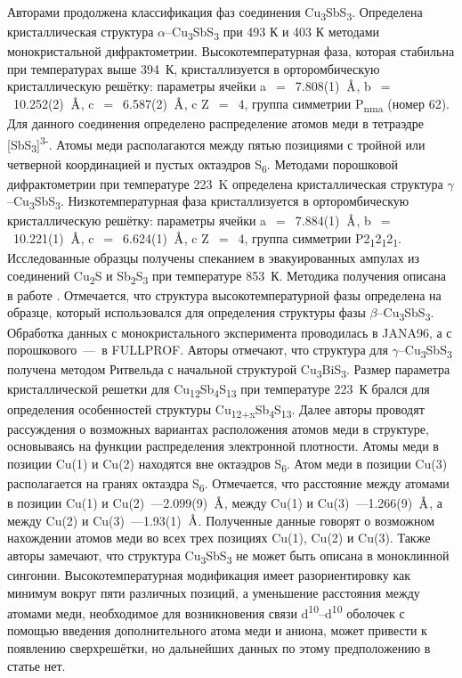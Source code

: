 Авторами \cite{Pfitzner1998a} продолжена классификация фаз соединения Cu\textsubscript{3}SbS\textsubscript{3}. Определена кристаллическая структура $\alpha$--Cu\textsubscript{3}SbS\textsubscript{3} при 493 К и 403 К методами монокристальной дифрактометрии. Высокотемпературная фаза, которая стабильна при температурах выше 394~К, кристаллизуется в орторомбическую кристаллическую решётку: параметры ячейки a~$=$~7.808(1)~$\mbox{\normalfont\AA}$, b~$=$~10.252(2)~$\mbox{\normalfont\AA}$, c~$=$~6.587(2)~$\mbox{\normalfont\AA}$,  c Z~$=$~4, группа симметрии P\textsubscript{nma} (номер 62). Для данного соединения определено распределение атомов меди в тетраэдре [SbS\textsubscript{3}]\textsuperscript{3-}.  Атомы меди располагаются между пятью позициями с тройной или четверной координацией и пустых октаэдров S\textsubscript{6}.  Методами порошковой дифрактометрии при температуре 223~K определена кристаллическая структура $\gamma$--Cu\textsubscript{3}SbS\textsubscript{3}. Низкотемпературная фаза кристаллизуется в орторомбическую кристаллическую решётку: параметры ячейки a~$=$~7.884(1)~$\mbox{\normalfont\AA}$, b~$=$~10.221(1)~$\mbox{\normalfont\AA}$, c~$=$~6.624(1)~$\mbox{\normalfont\AA}$,  c Z~$=$~4, группа симметрии P2\textsubscript{1}2\textsubscript{1}2\textsubscript{1}. Исследованные образцы получены спеканием в эвакуированных ампулах из соединений Cu\textsubscript{2}S и Sb\textsubscript{2}S\textsubscript{3} при температуре 853~К. Методика получения описана в работе \cite{Pfitzner_1994}. Отмечается, что структура высокотемпературной фазы определена на образце,  который использовался для определения структуры фазы $\beta$--Cu\textsubscript{3}SbS\textsubscript{3}. Обработка данных с монокристального эксперимента проводилась в JANA96, а с порошкового~---~в FULLPROF. Авторы отмечают, что структура для $\gamma$--Cu\textsubscript{3}SbS\textsubscript{3} получена методом Ритвельда с начальной структурой Cu\textsubscript{3}BiS\textsubscript{3}. Размер параметра кристаллической решетки для Cu\textsubscript{12}Sb\textsubscript{4}S\textsubscript{13} при температуре 223~К брался для определения особенностей структуры Cu\textsubscript{12+x}Sb\textsubscript{4}S\textsubscript{13}. Далее авторы проводят рассуждения о возможных вариантах расположения атомов меди в структуре, основываясь на  функции распределения электронной плотности. Атомы меди в позиции Cu(1) и Cu(2) находятся вне октаэдров S\textsubscript{6}. Атом меди в позиции Cu(3) располагается на гранях октаэдра  S\textsubscript{6}. Отмечается, что расстояние между атомами в позиции Cu(1) и Cu(2)~---2.099(9)~$\mbox{\normalfont\AA}$, между  Cu(1) и Cu(3)~---1.266(9)~$\mbox{\normalfont\AA}$, а между Cu(2) и Cu(3)~---1.93(1)~$\mbox{\normalfont\AA}$. Полученные данные говорят о возможном нахождении атомов меди во всех трех позициях Cu(1), Cu(2) и Cu(3). Также авторы замечают, что структура Cu\textsubscript{3}SbS\textsubscript{3} не может быть описана в моноклинной сингонии. Высокотемпературная модификация имеет разориентировку как минимум вокруг пяти различных позиций, а уменьшение расстояния между атомами меди, необходимое для возникновения связи d\textsuperscript{10}--d\textsuperscript{10} оболочек с помощью введения дополнительного атома меди и аниона, может привести к появлению сверхрешётки, но дальнейших данных по этому предположению в статье нет.


